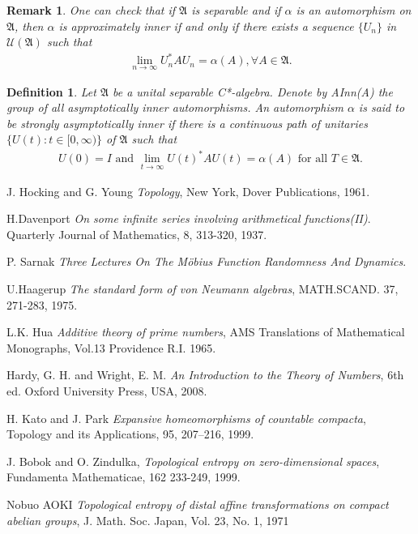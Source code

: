 \documentclass[a4paper,10pt]{amsart}
\newtheorem{definition}{Definition}[section]
\newtheorem{remark}{Remark}[section]
\newcommand{\AAA}{\mathfrak A}
\begin{document}
\begin{remark}
    One can check that if $\AAA$ is separable and if $\alpha$ is
    an automorphism on $\AAA$, then $\alpha$ is approximately inner
    if and only if there exists a sequence $\{U_{n}\}$ in 
    $\mathcal{U}(\AAA)$ such that 
    \begin{align*}
        \lim_{n \rightarrow \infty}U^{*}_{n}AU_{n} = \alpha(A), 
        \forall A \in \AAA.
    \end{align*}
\end{remark}

\begin{definition}
Let $\AAA$ be a unital separable C*-algebra. 
Denote by AInn(A)
the group of all asymptotically inner automorphisms. 
An automorphism $\alpha$ is said to be strongly asymptotically 
inner if there is a continuous path of unitaries 
$\{ U(t): t \in [0, \infty)\}$ of $\AAA$ such that
\begin{align*}
    U(0) = I \mbox{ and } \lim_{t \rightarrow \infty}U(t)^{*}AU(t) =
    \alpha(A) \mbox{ for all } T \in \AAA.
    \end{align*}
\end{definition}


\begin{thebibliography}{9}
   J. Hocking and G. Young
   \emph{Topology},
   New York, Dover Publications, 1961.

  H.Davenport
  \emph{On some infinite series involving arithmetical functions(II)}.
  Quarterly Journal of Mathematics, 8,
  313-320, 1937.

  P. Sarnak 
  \emph{Three Lectures On The M\"{o}bius Function Randomness And
  Dynamics}.

  U.Haagerup 
  \emph{The standard form of von Neumann algebras},
  MATH.SCAND. 37, 271-283, 1975.

    L.K. Hua
    \emph{Additive theory of prime numbers},
    AMS Translations of Mathematical Monographs, Vol.13
    Providence R.I. 1965.

      Hardy, G. H. and Wright, E. M. 
      \emph{An Introduction to the Theory of Numbers}, 
      6th ed. Oxford University Press, USA, 2008. 

  H. Kato and J. Park
  \emph{Expansive homeomorphisms of countable compacta},
  Topology and its Applications, 95, 207–216, 1999.

    J. Bobok and O. Zindulka,
    \emph{Topological entropy on zero-dimensional spaces},
    Fundamenta Mathematicae, 162 233-249, 1999.

    Nobuo AOKI
    \emph{Topological entropy of distal affine transformations
    on compact abelian groups},
    J. Math. Soc. Japan, Vol. 23, No. 1, 1971

\end{thebibliography}
\end{document}
